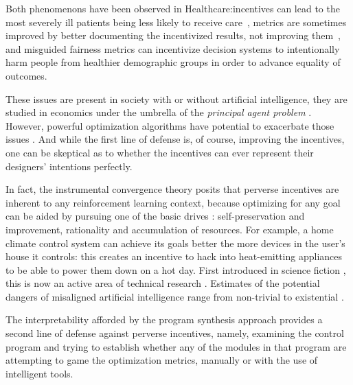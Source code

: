 Both phenomenons have been observed in Healthcare:incentives can lead to the most severely ill patients being less likely to receive care~\cite{shenSelectionIncentivesPerformance2003}, metrics are sometimes improved by better documenting the incentivized results, not improving them~\cite{fairbrotherImpactFinancialIncentives2001, fairbrotherImpactPhysicianBonuses1999, roskiImpactFinancialIncentives2003}, and misguided fairness metrics \cite{longFairnessMachineLearning2021} can incentivize decision systems to intentionally harm people from healthier demographic groups in order to advance equality of outcomes.

These issues are present in society \cite{nestianPerverseIncentiveGeneral2017} with or without artificial intelligence, they are studied in economics under the umbrella of the \emph{principal agent problem} \cite{pandaAgencyTheoryReview2017}. 
However, powerful optimization algorithms have potential to exacerbate those issues \cite{hadfield-menellIncompleteContractingAI2019}. 
And while the first line of defense is, of course, improving the incentives, one can be skeptical as to whether the incentives can ever represent their designers' intentions perfectly.

In fact, the instrumental convergence theory \cite{benson-tilsenFormalizingConvergentInstrumental,bostromSuperintelligencePathsDangers2016} posits that perverse incentives are inherent to any reinforcement learning context, because optimizing for any goal can be aided by pursuing one of the basic drives \cite{omohundroBasicAIDrives2018}: self-preservation and improvement, rationality and accumulation of resources.
For example, a home climate control system can achieve its goals better the more devices in the user's house it controls: this creates an incentive to hack into heat-emitting appliances to be able to power them down on a hot day.
First introduced in science fiction \cite{clarke2001SpaceOdyssey2016, ellisonHaveNoMouth1967, jonesColossus2019}, this is now an active area of technical research \cite{jiAIAlignmentComprehensive2024}.
Estimates of the potential dangers of misaligned artificial intelligence range from non-trivial to existential \cite{mcleanRisksAssociatedArtificial2023}.

The interpretability afforded by the program synthesis approach provides a second line of defense against perverse incentives, namely, examining the control program and trying to establish whether any of the modules in that program are attempting to game the optimization metrics, manually or with the use of intelligent tools.

